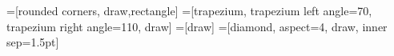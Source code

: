 =[rounded corners, draw,rectangle]
=[trapezium, trapezium left angle=70, trapezium right angle=110, draw]
=[draw]
=[diamond, aspect=4, draw, inner sep=1.5pt]




